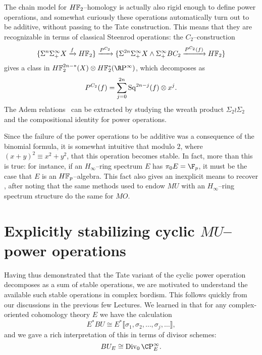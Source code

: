 \begin{example}
The chain model for \(\HFtwo\)--homology is actually also rigid enough to define power operations, and somewhat curiously these operations automatically turn out to be additive, without passing to the Tate construction.  This means that they are recognizable in terms of classical Steenrod operations: the \(C_2\)--construction \[\{\Susp^n \Susp^\infty_+ X \xrightarrow{f} \HFtwo\} \xrightarrow{P^{C_2}} \{\Susp^{2n} \Susp^\infty_+ X \sm \Susp^\infty_+ BC_2 \xrightarrow{P^{C_2}(f)} \HFtwo\}\] gives a class in \(\HFtwo^{2n-*}(X) \otimes \HFtwo^*(\RP^\infty)\), which decomposes as \[P^{C_2}(f) = \sum_{j=0}^{2n} \operatorname{Sq}^{2n-j}(f) \otimes x^j.\]  The Adem relations~\cite{Adem} can be extracted by studying the wreath product \(\Sigma_2 \wr \Sigma_2\) and the compositional identity for power operations.
\end{example}

\begin{remark}\label{HinftyRingsModp}
Since the failure of the power operations to be additive was a consequence of the binomial formula, it is somewhat intuitive that modulo \(2\), where \((x + y)^2 \equiv x^2 + y^2\), that this operation becomes stable.  In fact, more than this is true: for instance, if an \(H_\infty\)--ring spectrum \(E\) has \(\pi_0 E = \F_p\), it must be the case that \(E\) is an \(\HFp\)--algebra.  This fact also gives an inexplicit means to recover , after noting that the same methods used to endow \(MU\) with an \(H_\infty\)--ring spectrum structure do the same for \(MO\).
\end{remark}















\section{Explicitly stabilizing cyclic \texorpdfstring{\(MU\)}{MU}--power operations}\label{StabilizingTheMUSteenrodOps}

Having thus demonstrated that the Tate variant of the cyclic power operation decomposes as a sum of stable operations, we are motivated to understand the available such stable operations in complex bordism.  This follows quickly from our discussions in the previous few Lectures.  We learned in  that for any complex-oriented cohomology theory \(E\) we have the calculation \[E^* BU \cong E^*\llbracket \sigma_1, \sigma_2, \ldots, \sigma_j, \ldots\rrbracket,\] and we gave a rich interpretation of this in terms of divisor schemes: \[BU_E \cong \Div_0 \CP^\infty_E.\]

